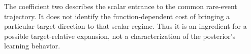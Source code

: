 The coefficient two describes the scalar entrance to the common
rare-event trajectory. It does not identify the function-dependent
cost of bringing a particular target direction to that scalar regime.
Thus it is an ingredient for a possible target-relative expansion,
not a characterization of the posterior's learning behavior.
